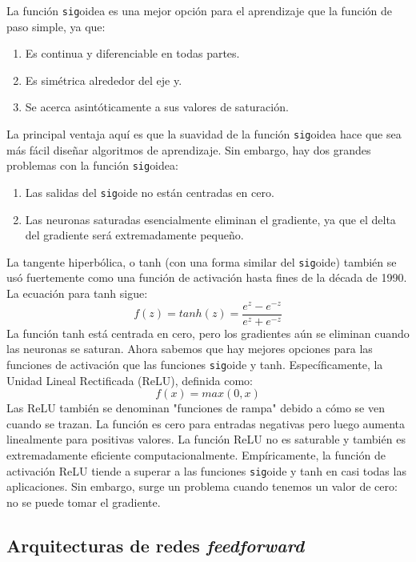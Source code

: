 \documentclass[a4paper,12pt]{article}
\begin{document}
La función \texttt{sig}oidea es una mejor opción para el aprendizaje que la función de paso simple, ya que:
\begin{enumerate}
\item Es continua y diferenciable en todas partes.
\item Es simétrica alrededor del eje y.
\item Se acerca asintóticamente a sus valores de saturación.
\end{enumerate}
La principal ventaja aquí es que la suavidad de la función \texttt{sig}oidea hace que sea más fácil diseñar algoritmos de aprendizaje. Sin embargo, hay dos grandes problemas con la función \texttt{sig}oidea:
\begin{enumerate}
\item Las salidas del \texttt{sig}oide no están centradas en cero.
\item Las neuronas saturadas esencialmente eliminan el gradiente, ya que el delta del gradiente será extremadamente pequeño.
\end{enumerate}

La tangente hiperbólica, o tanh (con una forma similar del \texttt{sig}oide) también se usó fuertemente como una función de activación hasta fines de la década de 1990.
La ecuación para tanh sigue:
\begin{equation}
f(z) = tanh(z) = \frac{e^z - e^{-z}}{e^z + e^{-z}}
\end{equation}
La función tanh está centrada en cero, pero los gradientes aún se eliminan cuando las neuronas se saturan.
Ahora sabemos que hay mejores opciones para las funciones de activación que las funciones \texttt{sig}oide y tanh. Específicamente, la Unidad Lineal Rectificada (ReLU), definida como:
\begin{equation}
f(x) = max(0, x)
\end{equation}
Las ReLU también se denominan "funciones de rampa" debido a cómo se ven cuando se trazan. La función es cero para entradas negativas pero luego aumenta linealmente para positivas valores. La función ReLU no es saturable y también es extremadamente  eficiente computacionalmente.
Empíricamente, la función de activación ReLU tiende a superar a las funciones \texttt{sig}oide y tanh en casi todas las aplicaciones. Sin embargo, surge un problema cuando tenemos un valor de cero: no se puede tomar el gradiente.

\subsection{Arquitecturas de redes \textit{feedforward}}
\end{document}
